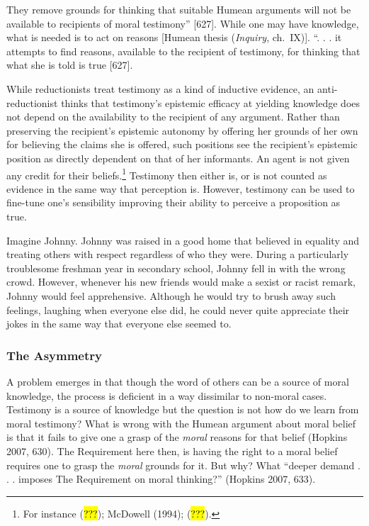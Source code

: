 \documentclass[
  letterpaper,
  DIV=11,
  numbers=noendperiod]{scrartcl}
\theoremstyle{remark}
\begin{document}
They remove grounds for thinking that suitable Humean arguments will not
be available to recipients of moral testimony'' {[}627{]}. While one may
have knowledge, what is needed is to act on reasons {[}Humean thesis
(\emph{Inquiry}, ch.~IX){]}. ``. . . it attempts to find reasons,
available to the recipient of testimony, for thinking that what she is
told is true {[}627{]}.

While reductionists treat testimony as a kind of inductive evidence, an
anti-reductionist thinks that testimony's epistemic efficacy at yielding
knowledge does not depend on the availability to the recipient of any
argument. Rather than preserving the recipient's epistemic autonomy by
offering her grounds of her own for believing the claims she is offered,
such positions see the recipient's epistemic position as directly
dependent on that of her informants. An agent is not given any credit
for their beliefs.\footnote{For instance (\hl{???}); McDowell (1994);
  (\hl{???}).} Testimony then either is, or is not counted as evidence
in the same way that perception is. However, testimony can be used to
fine-tune one's sensibility improving their ability to perceive a
proposition as true.

Imagine Johnny. Johnny was raised in a good home that believed in
equality and treating others with respect regardless of who they were.
During a particularly troublesome freshman year in secondary school,
Johnny fell in with the wrong crowd. However, whenever his new friends
would make a sexist or racist remark, Johnny would feel apprehensive.
Although he would try to brush away such feelings, laughing when
everyone else did, he could never quite appreciate their jokes in the
same way that everyone else seemed to.

\subsubsection{The Asymmetry}\label{the-asymmetry}

A problem emerges in that though the word of others can be a source of
moral knowledge, the process is deficient in a way dissimilar to
non-moral cases. Testimony is a source of knowledge but the question is
not how do we learn from moral testimony? What is wrong with the Humean
argument about moral belief is that it fails to give one a grasp of the
\emph{moral} reasons for that belief (Hopkins 2007, 630). The
Requirement here then, is having the right to a moral belief requires
one to grasp the \emph{moral} grounds for it. But why? What ``deeper
demand . . . imposes The Requirement on moral thinking?'' (Hopkins 2007,
633).
\end{document}
